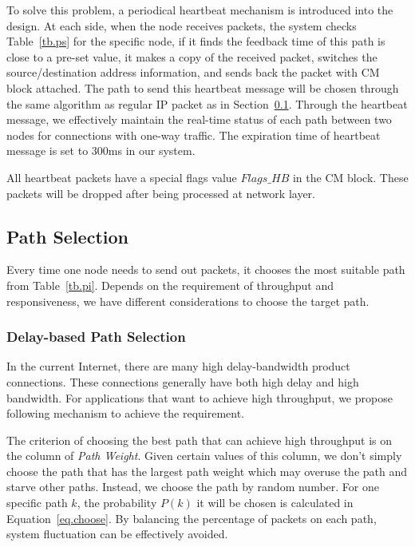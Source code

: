 To solve this problem, a periodical heartbeat mechanism is introduced into the design. At each side, when the node receives packets, the system checks Table~\ref{tb.ps} for the specific node, if it finds the feedback time of this path is close to a pre-set value, it makes a copy of the received packet, switches the source/destination address information, and sends back the packet with CM block attached. The path to send this heartbeat message will be chosen through the same algorithm as regular IP packet as in Section~\ref{sec:selection}. Through the heartbeat message, we effectively maintain the real-time status of each path between two nodes for connections with one-way traffic. The expiration time of heartbeat message is set to $300$ms in our system.

All heartbeat packets have a special flags value $Flags\_HB$ in the CM block. These packets will be dropped after being processed at network layer.

\subsection{Path Selection}
\label{sec:selection}

Every time one node needs to send out packets, it chooses the most suitable path from Table~\ref{tb.pi}. Depends on the requirement of throughput and responsiveness, we have different considerations to choose the target path.

\subsubsection{Delay-based Path Selection}
\label{sec:delay}
In the current Internet, there are many high delay-bandwidth product connections. These connections generally have both high delay and high bandwidth. For applications that want to achieve high throughput, we propose following mechanism to achieve the requirement.

The criterion of choosing the best path that can achieve high throughput is on the column of \emph{Path Weight}. Given certain values of this column, we don't simply choose the path that has the largest path weight which may overuse the path and starve other paths. Instead, we choose the path by random number. For one specific path $k$, the probability $P(k)$ it will be chosen is calculated in Equation~\ref{eq.choose}. By balancing the percentage of packets on each path, system fluctuation can be effectively avoided.

